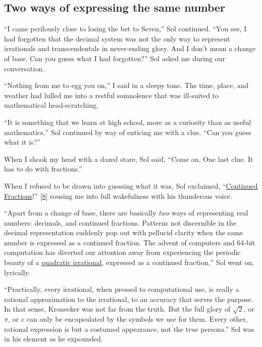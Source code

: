 \documentclass[
  a4paper,
]{article}
\begin{document}
\hypertarget{two-ways-of-expressing-the-same-number}{%
\subsection{Two ways of expressing the same
number}\label{two-ways-of-expressing-the-same-number}}

``I came perilously close to losing the bet to Seven,'' Sol continued.
``You see, I had forgotten that the decimal system was not the only way
to represent irrationals and transcendentals in never-ending glory. And
I don't mean a change of base. Can you guess what I had forgotten?'' Sol
asked me during our conversation.

``Nothing from me to egg you on,'' I said in a sleepy tone. The time,
place, and weather had lulled me into a restful somnolence that was
ill-suited to mathematical head-scratching.

``It is something that we learn at high school, more as a curiosity than
as useful mathematics,'' Sol continued by way of enticing me with a
clue. ``Can you guess what it is?''

When I shook my head with a dazed stare, Sol said, ``Come on. One last
clue. It has to do with fractions.''

When I refused to be drawn into guessing what it was, Sol exclaimed,
``\href{https://en.wikipedia.org/wiki/Continued_fraction}{Continued
Fractions}!'' {[}\protect\hyperlink{ref-loya2017}{8}{]} rousing me into
full wakefulness with his thunderous voice.

``Apart from a change of base, there are basically \emph{two} ways of
representing real numbers: decimals, and continued fractions. Patterns
not discernible in the decimal representation suddenly pop out with
pellucid clarity when the same number is expressed as a continued
fraction. The advent of computers and 64-bit computation has diverted
our attention away from experiencing the periodic beauty of a
\href{https://en.wikipedia.org/wiki/Quadratic_irrational_number}{quadratic
irrational}, expressed as a continued fraction,'' Sol went on,
lyrically.

``Practically, every irrational, when pressed to computational use, is
really a rational approximation to the irrational, to an accuracy that
serves the purpose. In that sense, Kronecker was not far from the truth.
But the full glory of \(\sqrt{2}\), or \(\pi\), or \(e\) can only be
encapsulated by the symbols we use for them. Every other, rational
expression is but a costumed appearance, not the true persona.'' Sol was
in his element as he expounded.
\end{document}
